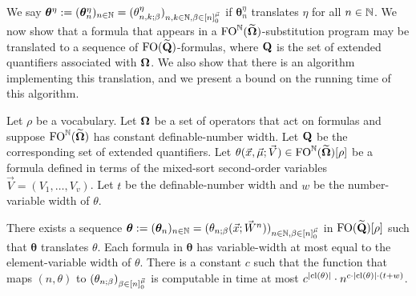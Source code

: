 \documentclass[../main/thesis.tex]{subfiles}
\begin{document}
We say $\boldsymbol{\theta}^{\eta} := (\boldsymbol{\theta}^{\eta}_{n})_{n \in
  \mathbb{N}} = (\theta^\eta_{n, k; \beta})_{n, k \in \mathbb{N}, \beta \in
  [n]^{\vec{\mu}}_0}$ if $\boldsymbol{\theta}^{\eta}_n$ translates $\eta$
for all $n \in \mathbb{N}$. We now show that a formula that appears in a
$\text{\upshape FO}^{\mathbb{N}} (\widetilde{\mathbf{\mathbf{\Omega}}})$-substitution program may be translated to a
sequence of $\text{\upshape FO} (\widetilde{\mathbf{Q}})$-formulas, where $\mathbf{Q}$ is the set of
extended quantifiers associated with $\mathbf{\mathbf{\Omega}}$. We also show that there is an
algorithm implementing this translation, and we present a bound on the running
time of this algorithm.

\begin{lem}
  \label{lem:translate-program-line}
  Let $\rho$ be a vocabulary. Let $\mathbf{\mathbf{\Omega}}$ be a set of operators that act on
  formulas and suppose $\text{\upshape FO}^{\mathbb{N}} (\widetilde{\mathbf{\mathbf{\Omega}}})$ has constant
  definable-number width. Let $\mathbf{Q}$ be the corresponding set of extended
  quantifiers. Let $\theta(\vec{x}, \vec{\mu}; \vec{V}) \in
  \text{\upshape FO}^{\mathbb{N}} (\widetilde{\mathbf{\mathbf{\Omega}}})[\rho]$ be a formula defined in terms of the
  mixed-sort second-order variables $\vec{V} = (V_1, \ldots, V_v)$. Let $t$ be
  the definable-number width and $w$ be the number-variable width of $\theta$.
  
  There exists a sequence $\boldsymbol{\theta} := (\boldsymbol{\theta}_n)_{n \in
    \mathbb{N}} = (\theta_{n; \beta}(\vec{x}; \vec{W}^n))_{n \in \mathbb{N}, \beta \in
    [n]^{\vec{\mu}}_0}$ in $\text{\upshape FO} (\widetilde{\mathbf{Q}})[\rho]$ such that
  $\boldsymbol{\theta}$ translates $\theta$. Each formula in
  $\boldsymbol{\theta}$ has variable-width at most equal to the element-variable
  width of $\theta$. There is a constant $c$ such that the function that maps
  $(n, \theta)$ to $(\theta_{n; \beta})_{\beta \in [n]^{\vec{\mu}}_0}$ is
  computable in time at most $c^{\vert \mathrm{cl}(\theta) \vert} \cdot n^{c \cdot \vert
    \mathrm{cl}(\theta) \vert \cdot (t + w)}$.
\end{lem}
\end{document}
